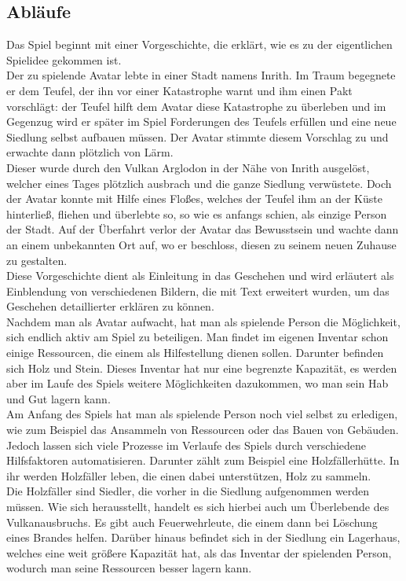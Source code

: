 \documentclass[paper=A4,pagesize=auto,12pt,headinclude=true,footinclude=true,BCOR=0mm,DIV=calc]{scrartcl}
\newcommand{\sectionspace}{
	\vspace{0.5cm}
}
\begin{document}
\sectionspace
\subsection{Abläufe}\label{sec:Ablaeufe}
Das Spiel beginnt mit einer Vorgeschichte, die erklärt, wie es zu der eigentlichen Spielidee gekommen ist. \\
Der zu spielende Avatar lebte in einer Stadt namens Inrith. Im Traum begegnete er dem Teufel, der ihn vor einer Katastrophe warnt und ihm einen Pakt vorschlägt: der Teufel hilft dem Avatar diese Katastrophe zu überleben und im Gegenzug wird er später im Spiel Forderungen des Teufels erfüllen und eine neue Siedlung selbst aufbauen müssen. Der Avatar stimmte diesem Vorschlag zu und erwachte dann plötzlich von Lärm. \\
Dieser wurde durch den Vulkan Arglodon in der Nähe von Inrith ausgelöst, welcher eines Tages plötzlich ausbrach und die ganze Siedlung verwüstete. Doch der Avatar konnte mit Hilfe eines Floßes, welches der Teufel ihm an der Küste hinterließ, fliehen und überlebte so, so wie es anfangs schien, als einzige Person der Stadt. Auf der Überfahrt verlor der Avatar das Bewusstsein und wachte dann an einem unbekannten Ort auf, wo er beschloss, diesen zu seinem neuen Zuhause zu gestalten. \\
Diese Vorgeschichte dient als Einleitung in das Geschehen und wird erläutert als Einblendung von verschiedenen Bildern, die mit Text erweitert wurden, um das Geschehen detaillierter erklären zu können. \\
Nachdem man als Avatar aufwacht, hat man als spielende Person die Möglichkeit, sich endlich aktiv am Spiel zu beteiligen. Man findet im eigenen Inventar schon einige Ressourcen, die einem als Hilfestellung dienen sollen. Darunter befinden sich Holz und Stein. Dieses Inventar hat nur eine begrenzte Kapazität, es werden aber im Laufe des Spiels weitere Möglichkeiten dazukommen, wo man sein Hab und Gut lagern kann.\\
Am Anfang des Spiels hat man als spielende Person noch viel selbst zu erledigen, wie zum Beispiel das Ansammeln von Ressourcen oder das Bauen von Gebäuden. Jedoch lassen sich viele Prozesse im Verlaufe des Spiels durch verschiedene Hilfsfaktoren automatisieren. Darunter zählt zum Beispiel eine Holzfällerhütte. In ihr werden Holzfäller leben, die einen dabei unterstützen, Holz zu sammeln. \\
Die Holzfäller sind Siedler, die vorher in die Siedlung aufgenommen werden müssen. Wie sich herausstellt, handelt es sich hierbei auch um Überlebende des Vulkanausbruchs. Es gibt auch Feuerwehrleute, die einem dann bei Löschung eines Brandes helfen. Darüber hinaus befindet sich in der Siedlung ein Lagerhaus, welches eine weit größere Kapazität hat, als das Inventar der spielenden Person, wodurch man seine Ressourcen besser lagern kann. \\
\end{document}

